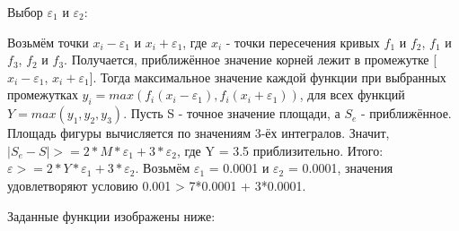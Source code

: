 \documentclass[a4paper,12pt,titlepage,finall]{article}
\begin{document}
{Выбор $\varepsilon_1$  и $\varepsilon_2$:} 

Возьмём точки $x_i - \varepsilon_1$ и $x_i + \varepsilon_1$, где $x_i$ - точки пересечения кривых $f_{1}$ и $f_{2}$, $f_{1}$ и $f_{3}$, $f_{2}$ и $f_{3}$. Получается, приближённое значение корней лежит в промежутке [$x_i - \varepsilon_1$, $x_i + \varepsilon_1$]. Тогда максимальное значение каждой функции при выбранных промежутках $y_i = max(f_i(x_i - \varepsilon_1), f_i(x_i + \varepsilon_1))$, для всех функций $Y = max(y_1, y_2, y_3)$. Пусть S - точное значение площади, а $S_e$ - приближённое. Площадь фигуры вычисляется по значениям 3-ёх интегралов. Значит, $|S_e - S| >= 2*M*\varepsilon_1 + 3*\varepsilon_2$, где Y = 3.5 приблизительно. Итого: $\varepsilon >= 2*Y*\varepsilon_1 + 3*\varepsilon_2$. Возьмём $\varepsilon_1$ = 0.0001 и $\varepsilon_2$ = 0.0001, значения удовлетворяют условию 0.001 > 7*0.0001 + 3*0.0001.


Заданные функции изображены ниже:
\end{document}

